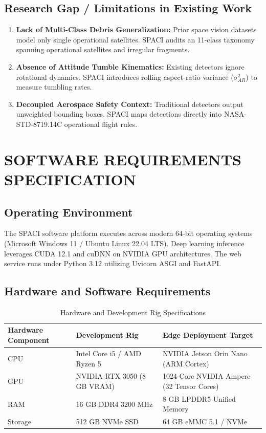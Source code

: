 \documentclass[12pt]{report}
\begin{document}
\section{Research Gap / Limitations in Existing Work}
\begin{enumerate}
    \item \textbf{Lack of Multi-Class Debris Generalization:} Prior space vision datasets model only single operational satellites. SPACI audits an 11-class taxonomy spanning operational satellites and irregular fragments.
    \item \textbf{Absence of Attitude Tumble Kinematics:} Existing detectors ignore rotational dynamics. SPACI introduces rolling aspect-ratio variance ($\sigma^2_{AR}$) to measure tumbling rates.
    \item \textbf{Decoupled Aerospace Safety Context:} Traditional detectors output unweighted bounding boxes. SPACI maps detections directly into NASA-STD-8719.14C operational flight rules.
\end{enumerate}

\chapter{SOFTWARE REQUIREMENTS SPECIFICATION}
\section{Operating Environment}
The SPACI software platform executes across modern 64-bit operating systems (Microsoft Windows 11 / Ubuntu Linux 22.04 LTS). Deep learning inference leverages CUDA 12.1 and cuDNN on NVIDIA GPU architectures. The web service runs under Python 3.12 utilizing Uvicorn ASGI and FastAPI.

\section{Hardware and Software Requirements}
\begin{table}[h]
\centering
\small
\begin{tabular}{|l|l|l|}
\hline
\textbf{Hardware Component} & \textbf{Development Rig} & \textbf{Edge Deployment Target} \\ \hline
CPU & Intel Core i5 / AMD Ryzen 5 & NVIDIA Jetson Orin Nano (ARM Cortex) \\ \hline
GPU & NVIDIA RTX 3050 (8 GB VRAM) & 1024-Core NVIDIA Ampere (32 Tensor Cores) \\ \hline
RAM & 16 GB DDR4 3200 MHz & 8 GB LPDDR5 Unified Memory \\ \hline
Storage & 512 GB NVMe SSD & 64 GB eMMC 5.1 / NVMe \\ \hline
\end{tabular}
\caption{Hardware and Development Rig Specifications}
\label{tab:hw_specs}
\end{table}
\end{document}
